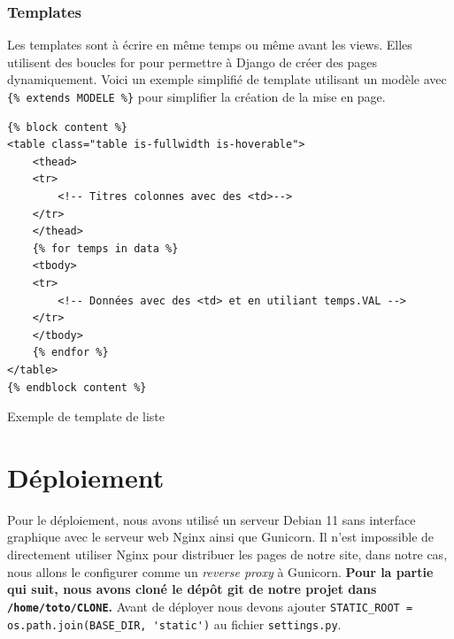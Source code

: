 \documentclass{article}
\begin{document}
\subsubsection{Templates}
Les templates sont à écrire en même temps ou même avant les views.
Elles utilisent des boucles for pour permettre à Django de créer des pages dynamiquement.
Voici un exemple simplifié de template utilisant un modèle avec \verb|{% extends MODELE %}| pour simplifier la création de la mise en page.
\begin{listing}[H]
    \begin{verbatim}
{% block content %}
<table class="table is-fullwidth is-hoverable">
    <thead>
    <tr>
        <!-- Titres colonnes avec des <td>-->
    </tr>
    </thead>
    {% for temps in data %}
    <tbody>
    <tr>
        <!-- Données avec des <td> et en utiliant temps.VAL -->
    </tr>
    </tbody>
    {% endfor %}
</table>
{% endblock content %}
    \end{verbatim}
    \caption{Exemple de template de liste}
    \label{}
\end{listing}

\section{Déploiement}
Pour le déploiement, nous avons utilisé un serveur Debian 11 sans interface graphique avec le serveur web Nginx ainsi que Gunicorn.
Il n'est impossible de directement utiliser Nginx pour distribuer les pages de notre site, dans notre cas, nous allons le configurer comme un \emph{reverse proxy} à Gunicorn. {\bf Pour la partie qui suit, nous avons cloné le dépôt git de notre projet dans \verb|/home/toto/CLONE|.} Avant de déployer nous devons ajouter \verb|STATIC_ROOT = os.path.join(BASE_DIR, 'static')| au fichier \verb|settings.py|.
\end{document}
